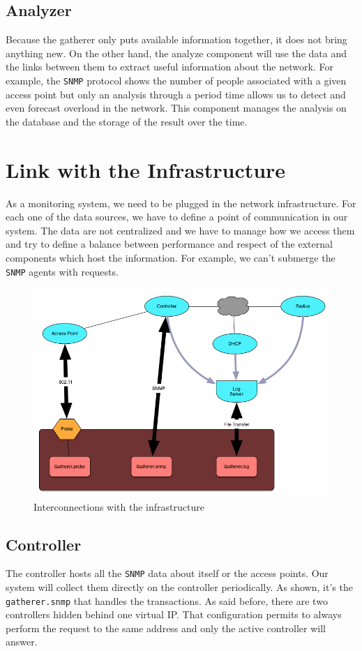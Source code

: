 \subsection{Analyzer}
Because the gatherer only puts available information together, it does not bring anything new. On the other hand, the analyze component will use the data and the links between them to extract useful information about the network. For example, the \texttt{SNMP} protocol shows the number of people associated with a given access point but only an analysis through a period time allows us to detect and even forecast overload in the network. This component manages the analysis on the database and the storage of the result over the time.

\section{Link with the Infrastructure}
As a monitoring system, we need to be plugged in the network infrastructure. For each one of the data sources, we have to define a point of communication in our system. The data are not centralized and we have to manage how we access them and try to define a balance between performance and respect of the external components which host the information. For example, we can't submerge the \texttt{SNMP} agents with requests.

\begin{figure}[H]
\centering
	\includegraphics[width=1\linewidth]{Pictures/chapter3/interactions.jpg}
	\caption{Interconnections with the infrastructure}
\end{figure}

\subsection{Controller}
The controller hosts all the \texttt{SNMP} data about itself or the access points. Our system will collect them directly on the controller periodically. As shown, it's the \texttt{gatherer.snmp} that handles the transactions. As said before, there are two controllers hidden behind one virtual IP. That configuration permits to always perform the request to the same address and only the active controller will answer.


